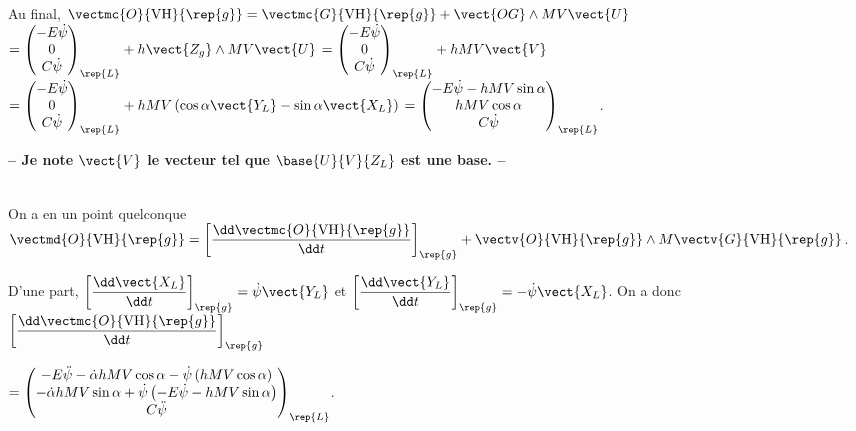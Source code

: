 \begin{multicols}{2}
\begin{corrige}
Au final, 
$\vectmc{O}{\text{VH}}{\rep{g}} =\vectmc{G}{\text{VH}}{\rep{g}} +\vect{OG}\wedge MV\vect{U}$
$ = \begin{pmatrix} -E\dot{\psi} \\ 0 \\ C\dot{\psi} \end{pmatrix}_{\rep{L}} + h\vect{Z_g} \wedge MV\vect{U}$ 
$ = \begin{pmatrix} -E\dot{\psi} \\ 0 \\ C\dot{\psi} \end{pmatrix}_{\rep{L}} + hMV\vect{V}$ 
$ = \begin{pmatrix} -E\dot{\psi} \\ 0 \\ C\dot{\psi} \end{pmatrix}_{\rep{L}} + hMV\left(\cos\alpha \vect{Y_L} - \sin\alpha \vect{X_L} \right)$ 
$ = \begin{pmatrix} -E\dot{\psi} - hMV \sin\alpha \\ hMV\cos\alpha \\ C\dot{\psi} \end{pmatrix}_{\rep{L}} $.

\textbf{ -- Je note $\vect{V}$ le vecteur tel que $\base{U}{V}{Z_L}$ est une base. --}
\end{corrige}
\else
\fi

\ifprof
\begin{corrige} ~\\

On a en un point quelconque
 $\vectmd{O}{\text{VH}}{\rep{g}} =\left[ \dfrac{\dd \vectmc{O}{\text{VH}}{\rep{g}}}{\dd t}\right]_{\rep{g}}+\vectv{O}{\text{VH}}{\rep{g}} \wedge M\vectv{G}{\text{VH}}{\rep{g}}$.
 
 D'une part, $\left[ \dfrac{\dd \vect{X_L} }{\dd t}\right]_{\rep{g}} = \dot{\psi}\vect{Y_L}$ et $\left[ \dfrac{\dd \vect{Y_L} }{\dd t}\right]_{\rep{g}} = -\dot{\psi}\vect{X_L}$. On a donc 
 $\left[ \dfrac{\dd \vectmc{O}{\text{VH}}{\rep{g}}}{\dd t}\right]_{\rep{g}} $ 
 
 $ = 
  \begin{pmatrix} 
  -E\ddot{\psi} - \dot{\alpha} hMV \cos\alpha - \dot{\psi}\left( hMV\cos\alpha\right)\\ 
  -\dot{\alpha} hMV\sin\alpha +\dot{\psi}\left( -E\dot{\psi} -  hMV \sin\alpha\right)\\ 
  C\ddot{\psi} \end{pmatrix}_{\rep{L}} 
  $.
  

\end{corrige}
\end{multicols}
